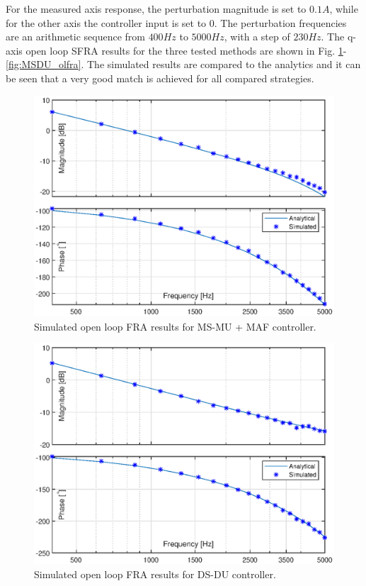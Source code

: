 \documentclass[journal]{IEEEtran}
\begin{document}
For the measured axis response, the perturbation magnitude is set to $0.1 A$, while for the other axis the controller input is set to 0. The perturbation frequencies are an arithmetic sequence from $400 Hz$ to $5000 Hz$, with a step of $230 Hz$. The q-axis open loop SFRA results for the three tested methods are shown in Fig. \ref{fig:MSMUmaf_olfra}-\ref{fig:MSDU_olfra}. The simulated results are compared to the analytics and it can be seen that a very good match is achieved for all compared strategies.

\begin{figure}[t!]
    \centerline{\includegraphics[width=0.95\linewidth]{figures/MSMUmaf_olfra.eps}}
    \caption{Simulated open loop FRA results for MS-MU + MAF controller.}
    \label{fig:MSMUmaf_olfra} 
\end{figure}
\begin{figure}[t!]
    \centerline{\includegraphics[width=0.95\linewidth]{figures/DSDU_olfra.eps}}
    \caption{Simulated open loop FRA results for DS-DU controller.}
    \label{fig:DSDU_olfra} 
\end{figure}
\end{document}
